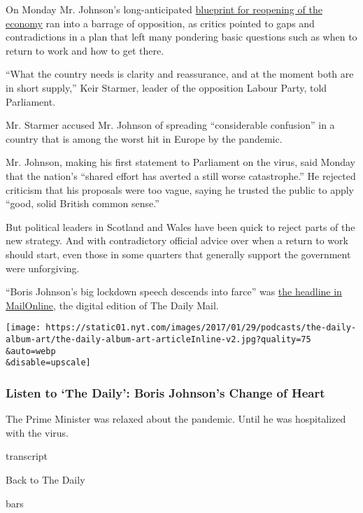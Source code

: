 On Monday Mr. Johnson's long-anticipated
\href{https://www.nytimes.com/2020/05/10/world/europe/coronavirus-britain-boris-johnson.html}{blueprint
for reopening of the economy} ran into a barrage of opposition, as
critics pointed to gaps and contradictions in a plan that left many
pondering basic questions such as when to return to work and how to get
there.

``What the country needs is clarity and reassurance, and at the moment
both are in short supply,'' Keir Starmer, leader of the opposition
Labour Party, told Parliament.

Mr. Starmer accused Mr. Johnson of spreading ``considerable confusion''
in a country that is among the worst hit in Europe by the pandemic.

Mr. Johnson, making his first statement to Parliament on the virus, said
Monday that the nation's ``shared effort has averted a still worse
catastrophe.'' He rejected criticism that his proposals were too vague,
saying he trusted the public to apply ``good, solid British common
sense.''

But political leaders in Scotland and Wales have been quick to reject
parts of the new strategy. And with contradictory official advice over
when a return to work should start, even those in some quarters that
generally support the government were unforgiving.

``Boris Johnson's big lockdown speech descends into farce'' was
\href{https://www.dailymail.co.uk/news/article-8306539/Commuters-crowd-Tubes-Boris-Johnson-urges-Britons-work.html}{the
headline in MailOnline}, the digital edition of The Daily Mail.

\texttt{[image: https://static01.nyt.com/images/2017/01/29/podcasts/the-daily-album-art/the-daily-album-art-articleInline-v2.jpg?quality=75\\\&auto=webp\\\&disable=upscale]}

\hypertarget{listen-to-the-daily-boris-johnsons-change-of-heart}{%
\subsubsection{Listen to `The Daily': Boris Johnson's Change of
Heart}\label{listen-to-the-daily-boris-johnsons-change-of-heart}}

The Prime Minister was relaxed about the pandemic. Until he was
hospitalized with the virus.

transcript

Back to The Daily

bars

